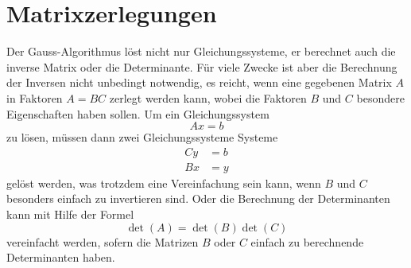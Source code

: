 %
%
%
\chapter{Matrixzerlegungen\label{chapter-zerlegung}}
Der Gauss-Algorithmus löst nicht nur Gleichungssysteme, er berechnet
auch die inverse Matrix oder die Determinante.
Für viele Zwecke ist
aber die Berechnung der Inversen nicht unbedingt notwendig, es reicht,
wenn eine gegebenen Matrix $A$ in Faktoren $A=BC$ zerlegt werden kann,
wobei die Faktoren $B$ und $C$ besondere Eigenschaften haben sollen.
Um ein Gleichungssystem
\[
Ax=b
\]
zu lösen, müssen dann zwei Gleichungssysteme Systeme
\begin{align*}
Cy&=b\\
Bx&=y
\end{align*}
gelöst werden, was trotzdem eine Vereinfachung sein kann, wenn
$B$ und $C$ besonders einfach zu invertieren sind.
Oder die Berechnung der Determinanten kann mit Hilfe der Formel
\[
\det(A)=\det(B)\det(C)
\]
vereinfacht werden, sofern die Matrizen $B$ oder $C$ einfach
zu berechnende Determinanten haben.







